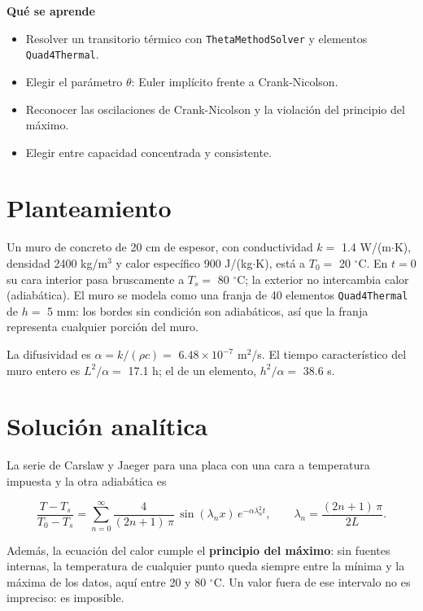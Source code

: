 \documentclass[11pt,oneside]{report}
\begin{document}
\textbf{Qué se aprende}

\begin{itemize}
  \item Resolver un transitorio térmico con \texttt{ThetaMethodSolver} y elementos \texttt{Quad4Thermal}.
  \item Elegir el parámetro \ensuremath{\theta}: Euler implícito frente a Crank-Nicolson.
  \item Reconocer las oscilaciones de Crank-Nicolson y la violación del principio del máximo.
  \item Elegir entre capacidad concentrada y consistente.
\end{itemize}

\section{Planteamiento}

Un muro de concreto de 20 cm de espesor, con conductividad $k =$ 1.4 W/(m\ensuremath{\cdot}K), densidad 2400 kg/m\ensuremath{^{3}} y calor específico 900 J/(kg\ensuremath{\cdot}K), está a $T_0 =$ 20 \ensuremath{^{\circ}}C. En $t = 0$ su cara interior pasa bruscamente a $T_s =$ 80 \ensuremath{^{\circ}}C; la exterior no intercambia calor (adiabática). El muro se modela como una franja de 40 elementos \texttt{Quad4Thermal} de $h =$ 5 mm: los bordes sin condición son adiabáticos, así que la franja representa cualquier porción del muro.

La difusividad es $\alpha = k/(\rho c) =$ $6.48\times 10^{-7}$ m\ensuremath{^{2}}/s. El tiempo característico del muro entero es $L^2/\alpha =$ 17.1 h; el de un elemento, $h^2/\alpha =$ 38.6 s.

\section{Solución analítica}

La serie de Carslaw y Jaeger para una placa con una cara a temperatura impuesta y la otra adiabática es

\[
\frac{T - T_s}{T_0 - T_s} = \sum_{n=0}^{\infty} \frac{4}{(2n+1)\,\pi}\,\sin(\lambda_n x)\,e^{-\alpha\lambda_n^2 t},
\qquad
\lambda_n = \frac{(2n+1)\,\pi}{2L} .
\]

Además, la ecuación del calor cumple el \textbf{principio del máximo}: sin fuentes internas, la temperatura de cualquier punto queda siempre entre la mínima y la máxima de los datos, aquí entre 20 y 80 \ensuremath{^{\circ}}C. Un valor fuera de ese intervalo no es impreciso: es imposible.
\end{document}
